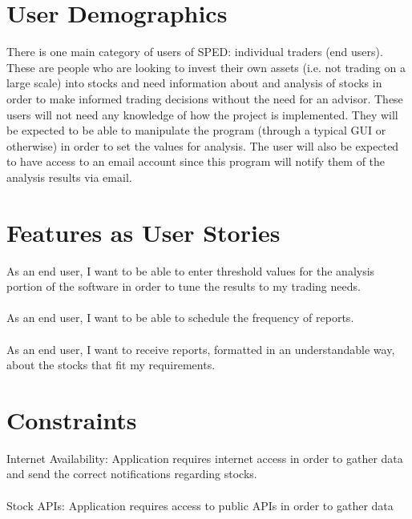 \documentclass[12pt]{article}
\begin{document}
\section{User Demographics}

There is one main category of users of SPED: individual traders (end users). These are people who are looking to invest their own assets (i.e. not trading on a large scale) into stocks and need information about and analysis of stocks in order to make informed trading decisions without the need for an advisor. These users will not need any knowledge of how the project is implemented. They will be expected to be able to manipulate the program (through a typical GUI or otherwise) in order to set the values for analysis. The user will also be expected to have access to an email account since this program will notify them of the analysis results via email.


\section{Features as User Stories}

As an end user,  I want to be able to enter threshold values for the analysis portion of the software in order to tune the results to  my trading needs.\\\\
As an end user, I want to be able to schedule the frequency of reports.
\\\\
As an end user, I want to receive reports, formatted in an understandable way, about the stocks that fit my requirements.

\section{Constraints}

Internet Availability: Application requires internet access in order to gather data and send the correct notifications regarding stocks.
\\\\
Stock APIs: Application requires access to public APIs in order to gather data
\end{document}
